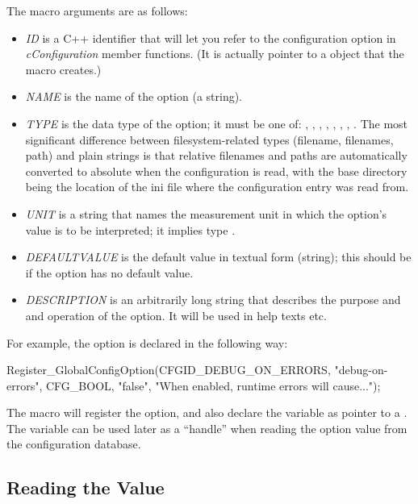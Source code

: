 The macro arguments are as follows:
\begin{itemize}
  \item \textit{ID} is a C++ identifier that will let you refer to
        the configuration option in \textit{cConfiguration} member functions.
        (It is actually pointer to a  object that
        the macro creates.)
  \item \textit{NAME} is the name of the option (a string).
  \item \textit{TYPE} is the data type of the option; it must be one of:
        , , , ,
        , , , .
        The most significant difference between filesystem-related types
        (filename, filenames, path) and plain strings is that relative
        filenames and paths are automatically converted to absolute
        when the configuration is read, with the base directory being the
        location of the ini file where the configuration entry was read from.
  \item \textit{UNIT} is a string that names the measurement unit in which
        the option's value is to be interpreted; it implies type .
  \item \textit{DEFAULTVALUE} is the default value in textual form (string);
        this should be  if the option has no default value.
  \item \textit{DESCRIPTION} is an arbitrarily long string that describes
        the purpose and and operation of the option. It will be used in
        help texts etc.
\end{itemize}

For example, the  option is declared in the following way:

\begin{cpp}
Register_GlobalConfigOption(CFGID_DEBUG_ON_ERRORS, "debug-on-errors",
    CFG_BOOL, "false", "When enabled, runtime errors will cause...");
\end{cpp}

The macro will register the option, and also declare the
 variable as pointer to a
. The variable can be used later as a ``handle'' when
reading the option value from the configuration database.

\subsection{Reading the Value}

